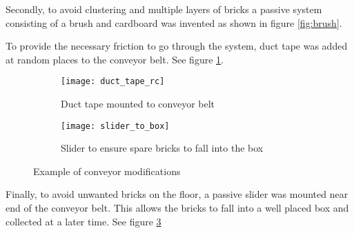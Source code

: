 Secondly, to avoid clustering and multiple layers of bricks a passive system consisting of a brush and cardboard was invented as shown in figure \ref{fig:brush}.

To provide the necessary friction to go through the system, duct tape was added at random places to the conveyor belt. See figure \ref{fig:duct_tape}.

  	\begin{figure}[H]
        \centering
        \begin{subfigure}{0.48\textwidth}
			\texttt{[image: duct\_tape\_rc]}
			\caption{Duct tape mounted to conveyor belt}
			\label{fig:duct_tape}
        \end{subfigure}
        \hspace{10pt}
        \begin{subfigure}{0.48\textwidth}
			\texttt{[image: slider\_to\_box]}
			\caption{Slider to ensure spare bricks to fall into the box}
			\label{fig:slider}
    \end{subfigure}
    \caption{Example of conveyor modifications}
    \end{figure}

Finally, to avoid unwanted bricks on the floor, a passive slider was mounted near end of the conveyor belt. This allows the bricks to fall into a well placed box and collected at a later time. See figure \ref{fig:slider} 
